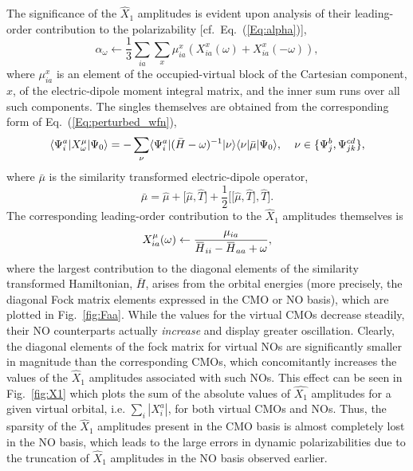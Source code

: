 \documentclass[journal=jpccck,manuscript=article]{achemso}
\newcommand{\overbar}[1]{\mkern 2.2mu\overline{\mkern-2.2mu#1\mkern-2.2mu}\mkern 2.2mu}
\begin{document}
The significance of the $\hat{X}_1$ amplitudes is evident upon analysis of
their leading-order contribution to the polarizability [cf.\
Eq.~(\ref{Eq:alpha})],
\begin{equation}
\alpha_\omega \leftarrow \frac{1}{3} \sum\limits_{ia}\sum\limits_x \mu^{x}_{ia}(X^x_{ia}(\omega) +
X^x_{ia}(-\omega)),
\label{Eq:leading_X1}
\end{equation} 
where $\mu^x_{ia}$ is an element of the occupied-virtual block of the
Cartesian component, $x$, of the electric-dipole moment integral matrix, and the inner
sum runs over all such components. The singles
themselves are obtained from the corresponding form of
Eq.~(\ref{Eq:perturbed_wfn}),
\begin{equation} 
\langle\Psi^a_i|X^{\mu}_{\omega}|\Psi_0\rangle =
-\sum_{\nu}\langle\Psi^a_i|(\bar{H} -
\omega)^{-1}|\nu\rangle\langle\nu|\bar{\mu}|\Psi_0\rangle,
\hspace{0.15in}\nu
\in \{\Psi^b_j,\Psi^{cd}_{jk}\},
\label{Eq:singles}
\end{equation} 
where $\bar{\mu}$ is the similarity transformed electric-dipole operator,
\begin{equation}
\bar{\mu} = \hat{\mu} + \bigg[\hat{\mu},\hat{T}\bigg] +
\frac{1}{2}\bigg[\bigg[\hat{\mu},\hat{T}\bigg],\hat{T}\bigg].
\label{Eq:mubar}
\end{equation}
The corresponding leading-order contribution to the $\hat{X}_1$ amplitudes themselves is
\begin{equation}
X^{\mu}_{ia}(\omega) \leftarrow \frac{\mu_{ia}}{\overbar{H}_{ii} -
\overbar{H}_{aa} + \omega},
\label{Eq:X1}
\end{equation}
where the largest contribution to the diagonal elements of the similarity
transformed Hamiltonian, $\bar{H}$, arises from the orbital energies (more
precisely, the diagonal Fock matrix elements expressed in the CMO or NO
basis), which are plotted in Fig.~\ref{fig:Faa}.  While the values for the
virtual CMOs decrease steadily, their NO counterparts actually {\em increase}
and display greater oscillation.  Clearly, the diagonal elements of the fock
matrix for virtual NOs are significantly smaller in magnitude than the
corresponding CMOs, which concomitantly increases the values of the
$\hat{X}_1$ amplitudes associated with such NOs.  This effect can be seen in
Fig.~\ref{fig:X1} which plots the sum of the absolute values of $\hat{X_1}$
amplitudes for a given virtual orbital, i.e.  $\sum_i |X_i^a|$, for both
virtual CMOs and NOs.  Thus, the sparsity of the $\hat{X}_1$ amplitudes present in the
CMO basis is almost completely lost in the NO basis, which leads to the large
errors in dynamic polarizabilities due to the truncation of $\hat{X}_1$
amplitudes in the NO basis observed earlier.  
\end{document}
